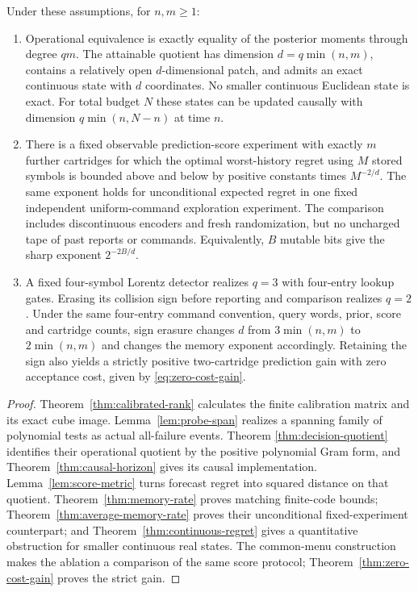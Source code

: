 \begin{theorem}\label{thm:decision-main}
Under these assumptions, for $n,m\ge1$:
\begin{enumerate}
\item Operational equivalence is exactly equality of the posterior moments
through degree $qm$. The attainable quotient has dimension
$d=q\min(n,m)$, contains a relatively open $d$-dimensional patch, and admits
an exact continuous state with $d$ coordinates. No smaller continuous
Euclidean state is exact. For total budget $N$ these states can be updated
causally with dimension $q\min(n,N-n)$ at time $n$.
\item There is a fixed observable prediction-score experiment with exactly
$m$ further cartridges for which the optimal worst-history regret using
$M$ stored symbols is bounded above and below by positive constants times
$M^{-2/d}$. The same exponent holds for unconditional expected regret in
one fixed independent uniform-command exploration experiment. The comparison includes discontinuous encoders and fresh
randomization, but no uncharged tape of past reports or commands. Equivalently,
$B$ mutable bits give the sharp exponent $2^{-2B/d}$.
\item A fixed four-symbol Lorentz detector realizes $q=3$ with four-entry
lookup gates. Erasing its collision sign before reporting and comparison
realizes $q=2$. Under the same four-entry command convention, query words,
prior, score and cartridge counts, sign erasure changes $d$ from
$3\min(n,m)$ to $2\min(n,m)$ and changes the memory exponent accordingly.
Retaining the sign also yields a strictly positive two-cartridge prediction
gain with zero acceptance cost, given by \eqref{eq:zero-cost-gain}.
\end{enumerate}
\end{theorem}
\begin{proof}
Theorem~\ref{thm:calibrated-rank} calculates the finite calibration matrix
and its exact cube image. Lemma~\ref{lem:probe-span} realizes a spanning
family of polynomial tests as actual all-failure events. Theorem
\ref{thm:decision-quotient} identifies their operational quotient by the
positive polynomial Gram form, and Theorem~\ref{thm:causal-horizon} gives
its causal implementation. Lemma~\ref{lem:score-metric} turns forecast
regret into squared distance on that quotient. Theorem~\ref{thm:memory-rate}
proves matching finite-code bounds; Theorem~\ref{thm:average-memory-rate}
proves their unconditional fixed-experiment counterpart; and
Theorem~\ref{thm:continuous-regret}
gives a quantitative obstruction for smaller continuous real states.
The common-menu construction makes the ablation a comparison of the same
score protocol; Theorem~\ref{thm:zero-cost-gain} proves the strict gain.
\end{proof}

